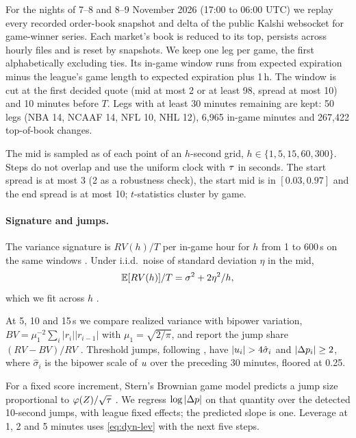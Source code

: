 For the nights of 7--8 and 8--9 November 2026 (17:00 to 06:00 UTC) we replay every recorded order-book
snapshot and delta of the public Kalshi websocket for game-winner series. Each market's book is
reduced to its top, persists across hourly files and is reset by snapshots. We keep one leg per
game, the first alphabetically excluding ties. Its in-game window runs from expected expiration
minus the league's game length to expected expiration plus 1\,h. The window is cut at the first
decided quote (mid at most 2\cents{} or at least 98\cents{}, spread at most 10\cents) and 10 minutes
before $T$. Legs with at least 30 minutes remaining are kept: 50 legs (NBA 14, NCAAF 14, NFL 10,
NHL 12), 6{,}965 in-game minutes and 267{,}422 top-of-book changes. %

The mid is sampled as of each point of an $h$-second grid, $h\in\{1,5,15,60,300\}$. Steps do not
overlap and use the uniform clock with $\tau$ in seconds. The start spread is at most 3\cents{}
(2\cents{} as a robustness check), the start mid is in $[0.03,0.97]$ and the end spread is at most
10\cents; $t$-statistics cluster by game.

\paragraph{Signature and jumps.}
The variance signature is $RV(h)/T$ per in-game hour for $h$ from 1 to 600\,s on the same windows
\citep{andersen2000signature}. Under i.i.d.\ noise of standard deviation $\eta$ in the mid,
\begin{equation}\label{eq:dyn-signature}
\mathbb{E}[RV(h)]/T=\sigma^2+2\eta^2/h ,
\end{equation}
which we fit across $h$ \citep{zhang2005,aitsahalia2005}.

At 5, 10 and 15\,s we compare realized variance with bipower variation,
$BV=\mu_1^{-2}\sum_i|r_i||r_{i-1}|$ with $\mu_1=\sqrt{2/\pi}$, and report the jump share
$(RV-BV)/RV$ \citep{barndorffnielsen2004,barndorffnielsen2006,huangtauchen2005}. Threshold jumps,
following \citet{leemykland2008}, have $|\ustd_i|>4\hat\sigma_i$ and $|\Delta p_i|\ge2$\cents,
where $\hat\sigma_i$ is the bipower scale of $u$ over the preceding 30 minutes, floored at 0.25.

For a fixed score increment, Stern's Brownian game model predicts a jump size proportional to
$\varphi(Z)/\sqrt{\tau}$ \citep{stern1994,polsonstern2015}. We regress $\log|\Delta p|$ on
that quantity over the detected 10-second jumps, with league fixed effects; the predicted slope is
one. Leverage at 1, 2 and 5 minutes uses \cref{eq:dyn-lev} with the next five steps.


